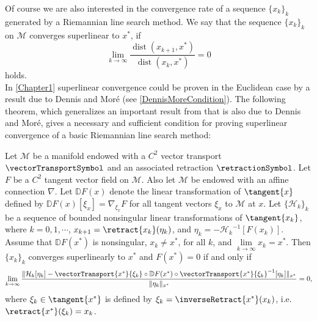 Of course we are also interested in the convergence rate of a sequence $\{ x_k \}_k$ generated by a Riemannian line search method. We say that the sequence $\{ x_k \}_k$ on $\mathcal{M}$ converges superlinear to $x^*$, if 
\begin{equation*}
    \lim\limits_{k \to \infty} \frac{\operatorname{dist}(x_{k+1}, x^*)}{\operatorname{dist}(x_k, x^*)} = 0
\end{equation*}
holds. \\
In \cref{Chapter1} superlinear convergence could be proven in the Euclidean case by a result due to Dennis and Mor\'{e} (see \cref{DennisMoreCondition}). The following theorem, which generalizes an important result from \cite[Theorem~8.2.4]{DennisSchnabel:1996} that is also due to Dennis and Mor\'{e}, gives a necessary and sufficient condition for proving superlinear convergence of a basic Riemannian line search method:

\begin{theorem}[{\cite[Theorem~2.3.1]{Qi:2011}}]\label{RiemannianDennisMoreCondition}
    Let $\mathcal{M}$ be a manifold endowed with a $C^2$ vector transport $\vectorTransportSymbol$ and an associated retraction $\retractionSymbol$. Let $F$ be a $C^2$ tangent vector field on $\mathcal{M}$. Also let $\mathcal{M}$ be endowed with an affine connection $\nabla$. Let $\mathbb{D}F(x)$ denote the linear transformation of $\tangent{x}$ defined by $\mathbb{D}F(x)[\xi_x] = \nabla_{\xi_x} F$ for all tangent vectors $\xi_x$ to $\mathcal{M}$ at $x$. Let $\{ \mathcal{H}_k \}_k$ be a sequence of bounded nonsingular linear transformations of $\tangent{x_k}$, where $k = 0, 1, \cdots$, $x_{k+1} = \retract{x_k}(\eta_k)$, and $\eta_k = - {\mathcal{H}_k}^{-1} [F(x_k)]$. Assume that $\mathbb{D}F(x^*)$ is nonsingular, $x_k \neq x^*$, for all $k$, and $\lim\limits_{k \to \infty} x_k = x^*$. Then $\{ x_k \}_k$ converges superlinearly to $x^*$ and $F(x^*) = 0$ if and only if
    \begin{equation*}
        \lim\limits_{k \to \infty} \frac{ \lVert \mathcal{H}_k[\eta_k] - \vectorTransport{x^*}{\xi_k} \circ \mathbb{D}F(x^*) \circ {\vectorTransport{x^*}{\xi_k}}^{-1}[\eta_k] \rVert_{x^*} }{ \lVert \eta_k \rVert_{x^*}} = 0,
    \end{equation*}
    where $\xi_k \in \tangent{x^*}$ is defined by $\xi_k = \inverseRetract{x^*}(x_k)$, i.e. $\retract{x^*}(\xi_k) = x_k$.
\end{theorem}

